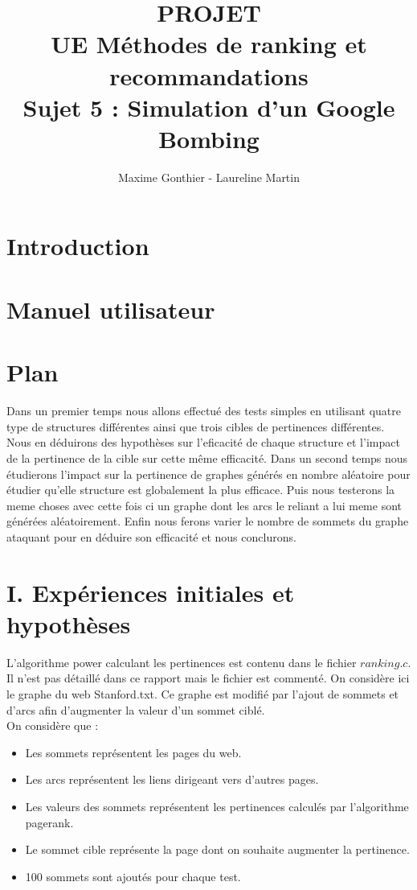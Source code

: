 \documentclass[a4paper,11pt]{article}
\title{PROJET\\ UE Méthodes de ranking et recommandations\\ 
		Sujet 5 : Simulation d'un Google Bombing}
\author{Maxime Gonthier - Laureline Martin}
\begin{document}
\clearpage
	\clearpage
	\maketitle
	\newpage\clearpage{}

\newpage
\tableofcontents
\newpage

\section{Introduction}
	
	
\section{Manuel utilisateur}
	

\section{Plan}
	Dans un premier temps nous allons effectué des tests simples en utilisant quatre type de structures différentes ainsi que trois cibles de pertinences différentes.
	Nous en déduirons des hypothèses sur l'eficacité de chaque structure et l'impact de la pertinence de la cible sur cette même efficacité.
	Dans un second temps nous étudierons l'impact sur la pertinence de graphes générés en nombre aléatoire pour étudier qu'elle structure est globalement la plus efficace.
	Puis nous testerons la meme choses avec cette fois ci un graphe dont les arcs le reliant a lui meme sont générées aléatoirement.
	Enfin nous ferons varier le nombre de sommets du graphe ataquant pour en déduire son efficacité et nous conclurons.
	
\section{I.		Expériences initiales et hypothèses}
	
	L'algorithme power calculant les pertinences est contenu dans le fichier $ranking.c$. Il n'est pas détaillé dans ce rapport mais le fichier est commenté.
	On considère ici le graphe du web Stanford.txt. Ce graphe est modifié par l'ajout de sommets et d'arcs afin d'augmenter la valeur d'un sommet ciblé.\\
	On considère que :\\
	\begin{itemize}
		\item Les sommets représentent les pages du web.
		\item Les arcs représentent les liens dirigeant vers d'autres pages.
		\item Les valeurs des sommets représentent les pertinences calculés par l'algorithme pagerank.
		\item Le sommet cible représente la page dont on souhaite augmenter la pertinence.
		\item 100 sommets sont ajoutés pour chaque test.
	\end{itemize}
\end{document}

